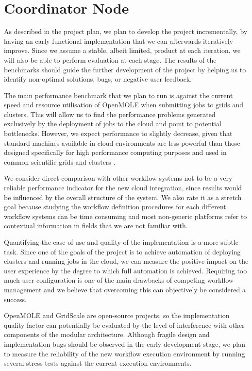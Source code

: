 \section{Coordinator Node} \label{CoordinatorOverheadSection}


As described in the project plan, we plan to develop the project incrementally, by having an early functional implementation that we can afterwards iteratively improve. Since we assume a stable, albeit limited, product at each iteration, we will also be able to perform evaluation at each stage. The results of the benchmarks should guide the further development of the project by helping us to identify non-optimal solutions, bugs, or negative user feedback.

The main performance benchmark that we plan to run is against the current speed and resource utilisation of OpenMOLE when submitting jobs to grids and clusters. This will allow us to find the performance problems generated exclusively by the deployment of jobs to the cloud and point to potential bottlenecks. However, we expect performance to slightly decrease, given that standard machines available in cloud environments are less powerful than those designed specifically for high performance computing purposes and used in common scientific grids and clusters \cite{Juve2009}.

We consider direct comparison with other workflow systems not to be a very reliable performance indicator for the new cloud integration, since results would be influenced by the overall structure of the system. We also rate it as a stretch goal because studying the workflow definition procedures for each different workflow systems can be time consuming and most non-generic platforms refer to contextual information in fields that we are not familiar with.

Quantifying the ease of use and quality of the implementation is a more subtle task. Since one of the goals of the project is to achieve automation of deploying clusters and running jobs in the cloud, we can measure the positive impact on the user experience by the degree to which full automation is achieved. Requiring too much user configuration is one of the main drawbacks of competing workflow management and we believe that overcoming this can objectively be considered a success.

OpenMOLE and GridScale are open-source projects, so the implementation quality factor can potentially be evaluated by the level of interference with other components of the modular architecture. Although fragile design and implementation bugs should be observed in the early development stage, we plan to measure the reliability of the new workflow execution environment by running several stress tests against the current execution environments.